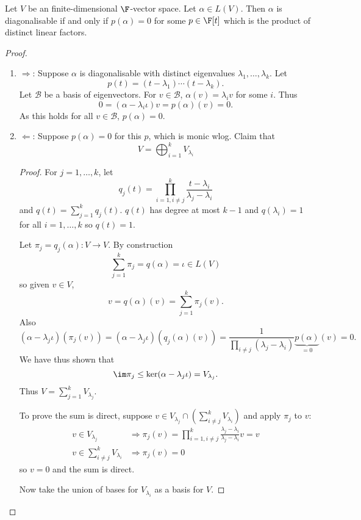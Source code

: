 \documentclass[a4paper]{article}
\newcommand*{\basis}{\mathcal}
\theoremstyle{definition}
\begin{document}
\begin{theorem}
  Let \(V\) be an finite-dimensional \(\F\)-vector space. Let \(\alpha \in L(V)\). Then \(\alpha\) is diagonalisable if and only if \(p(\alpha) = 0\) for some \(p \in \F[t]\) which is the product of distinct linear factors.
\end{theorem}

\begin{proof}\leavevmode
  \begin{enumerate}
  \item \(\Rightarrow\): Suppose \(\alpha\) is diagonalisable with distinct eigenvalues \(\lambda_1, \dots, \lambda_k\). Let
    \[
      p(t) = (t - \lambda_1) \cdots (t - \lambda_k).
    \]
    Let \(\basis B\) be a basis of eigenvectors. For \(v \in \basis B\), \(\alpha(v) = \lambda_i v\) for some \(i\). Thus
    \[
      0 = (\alpha - \lambda_i \iota) v = p(\alpha)(v) = 0.
    \]
    As this holds for all \(v \in \basis B\), \(p(\alpha) = 0\).
  \item \(\Leftarrow\): Suppose \(p(\alpha) = 0\) for this \(p\), which is monic wlog. Claim that
    \[
      V = \bigoplus_{i = 1}^k V_{\lambda_i}
    \]
    \begin{proof}
      For \(j = 1, \dots, k\), let
      \[
        q_j(t) = \prod_{i = 1, i \neq j}^k \frac{t - \lambda_i}{\lambda_j - \lambda_i}
      \]
      and \(q(t) = \sum_{j = 1}^k q_j(t)\). \(q(t)\) has degree at most \(k - 1\) and \(q(\lambda_i) = 1\) for all \(i = 1, \dots, k\) so \(q(t) = 1\).

      Let \(\pi_j = q_j(\alpha): V \to V\). By construction
      \[
        \sum_{j = 1}^{k} \pi_j = q(\alpha) = \iota \in L(V)
      \]
      so given \(v \in V\),
      \[
        v = q(\alpha) (v) = \sum_{j = 1}^{k} \pi_j(v).
      \]
      Also
      \[
        (\alpha - \lambda_j \iota)(\pi_j(v)) = (\alpha - \lambda_j\iota)(q_j(\alpha)(v)) = \frac{1}{\prod_{i \neq j}^{ } (\lambda_j - \lambda_i)} \underbrace{p(\alpha)}_{= 0}(v) = 0.
      \]
      We have thus shown that
      \[
        \im \pi_j \leq \ker(\alpha - \lambda_j \iota) = V_{\lambda_j}.
      \]
      Thus \(V = \sum_{j = 1}^{k} V_{\lambda_j}\).

      To prove the sum is direct, suppose \(v \in V_{\lambda_j} \cap (\sum_{i \neq j}^k V_{\lambda_i})\) and apply \(\pi_j\) to \(v\):
      \begin{align*}
        v \in V_{\lambda_j} &\Rightarrow \pi_j(v) = \prod_{i = 1, i \neq j}^{k} \frac{\lambda_j - \lambda_i}{\lambda_j - \lambda_i} v = v \\
        v \in \sum_{i \neq j}^{k}V_{\lambda_i} &\Rightarrow \pi_j(v) = 0
      \end{align*}
        so \(v = 0\) and the sum is direct.

        Now take the union of bases for \(V_{\lambda_i}\) as a basis for \(V\).
    \end{proof}
  \end{enumerate}
\end{proof}
\end{document}
